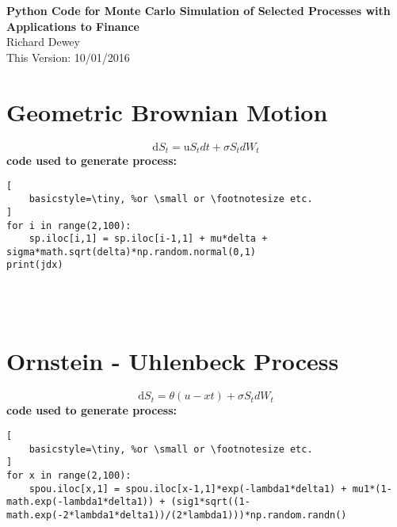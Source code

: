 \documentclass[a4paper, 11pt]{article}
\begin{document}
\noindent
\textbf{Python Code for Monte Carlo Simulation of Selected Processes with Applications to Finance}\\
Richard Dewey \\
This Version: 10/01/2016 \\


\section{Geometric Brownian Motion}

$$
{\mbox{d}{S}_{t} = \mbox{u}{S}_{t}{d}{t} + \sigma{S}_{t} {d}{W}_{t}}
$$
\textbf{code used to generate process:}
\begin{lstlisting}[
    basicstyle=\tiny, %or \small or \footnotesize etc.
]
for i in range(2,100):
	sp.iloc[i,1] = sp.iloc[i-1,1] + mu*delta + sigma*math.sqrt(delta)*np.random.normal(0,1)
print(jdx)
\end{lstlisting} \hfill \\ \\


\section{Ornstein - Uhlenbeck Process}

$$
{\mbox{d}{S}_{t} = \theta({u} - {x}{t}) + \sigma{S}_{t} {d}{W}_{t}}
$$
\textbf{code used to generate process:}
\begin{lstlisting}[
    basicstyle=\tiny, %or \small or \footnotesize etc.
]
for x in range(2,100):
	spou.iloc[x,1] = spou.iloc[x-1,1]*exp(-lambda1*delta1) + mu1*(1-math.exp(-lambda1*delta1)) + (sig1*sqrt((1-math.exp(-2*lambda1*delta1))/(2*lambda1)))*np.random.randn()
\end{lstlisting} \hfill \\ \\
\end{document}
